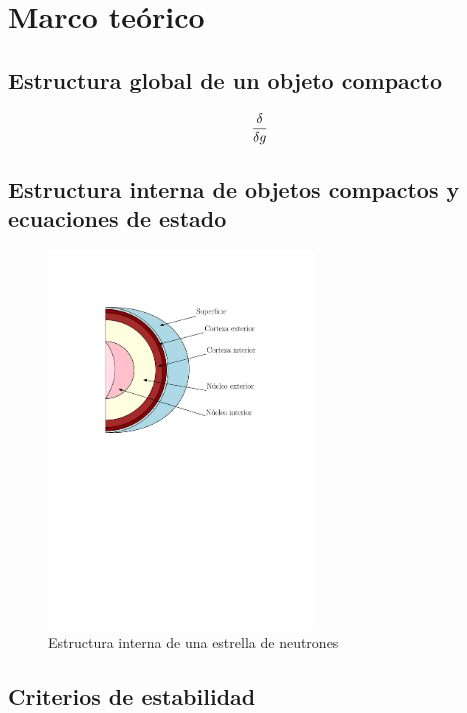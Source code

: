 \chapter{Marco teórico}

\section{Estructura global de un objeto compacto}

\begin{equation}
\fdv{g}    
\end{equation}


\section{Estructura interna de objetos compactos y ecuaciones de estado}

\begin{figure}[H]
    \centering
    \includegraphics[width=200pt]{figures/neutronstar.pdf}
    \caption{Estructura interna de una estrella de neutrones}
    \label{NSS}
\end{figure}

\section{Criterios de estabilidad}
